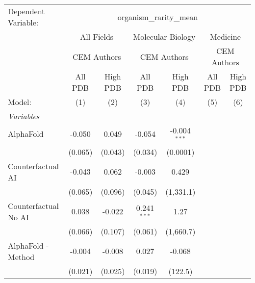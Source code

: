 \begingroup
\centering
\begin{tabular}{lcccccc}
   \tabularnewline \midrule \midrule
   Dependent Variable: & \multicolumn{6}{c}{organism\_rarity\_mean}\\
 & \multicolumn{2}{c}{All Fields} & \multicolumn{2}{c}{Molecular Biology} & \multicolumn{2}{c}{Medicine} \\
\cmidrule(lr){2-3} \cmidrule(lr){4-5} \cmidrule(lr){6-7}
 & \multicolumn{2}{c}{CEM Authors} & \multicolumn{2}{c}{CEM Authors} & \multicolumn{2}{c}{CEM Authors} \\
\cmidrule(lr){2-3} \cmidrule(lr){4-5} \cmidrule(lr){6-7}
 & \multicolumn{1}{c}{All PDB} & \multicolumn{1}{c}{High PDB} & \multicolumn{1}{c}{All PDB} & \multicolumn{1}{c}{High PDB} & \multicolumn{1}{c}{All PDB} & \multicolumn{1}{c}{High PDB} \\
\cmidrule(lr){2-2} \cmidrule(lr){3-3} \cmidrule(lr){4-4} \cmidrule(lr){5-5} \cmidrule(lr){6-6} \cmidrule(lr){7-7}
   Model:                                                     & (1)     & (2)       & (3)           & (4)            & (5) & (6)\\  
   \midrule
   \emph{Variables}\\
   AlphaFold                                                  & -0.050  & 0.049     & -0.054        & -0.004$^{***}$ &     &   \\   
                                                              & (0.065) & (0.043)   & (0.034)       & (0.0001)       &     &   \\   
   Counterfactual AI                                          & -0.043  & 0.062     & -0.003        & 0.429          &     &   \\   
                                                              & (0.065) & (0.096)   & (0.045)       & (1,331.1)      &     &   \\   
   Counterfactual No AI                                       & 0.038   & -0.022    & 0.241$^{***}$ & 1.27           &     &   \\   
                                                              & (0.066) & (0.107)   & (0.061)       & (1,660.7)      &     &   \\   
   AlphaFold - Method                                         & -0.004  & -0.008    & 0.027         & -0.068         &     &   \\   
                                                              & (0.021) & (0.025)   & (0.019)       & (122.5)        &     &   \\   

\end{tabular}
